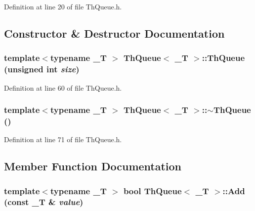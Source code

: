 Definition at line 20 of file ThQueue.h.

\subsection{Constructor \& Destructor Documentation}
\hypertarget{class_th_queue_6110171ecc9891a3d485b993ec4c14d2}{
\subsubsection[{ThQueue}]{\setlength{\rightskip}{0pt plus 5cm}template$<$typename \_\-T $>$ {\bf ThQueue}$<$ \_\-T $>$::{\bf ThQueue} (unsigned int {\em size})}}
\label{class_th_queue_6110171ecc9891a3d485b993ec4c14d2}




Definition at line 60 of file ThQueue.h.\hypertarget{class_th_queue_b32a990df6751f082db18f3c2cbcb8b8}{
\subsubsection[{$\sim$ThQueue}]{\setlength{\rightskip}{0pt plus 5cm}template$<$typename \_\-T $>$ {\bf ThQueue}$<$ \_\-T $>$::$\sim${\bf ThQueue} ()}}
\label{class_th_queue_b32a990df6751f082db18f3c2cbcb8b8}




Definition at line 71 of file ThQueue.h.

\subsection{Member Function Documentation}
\hypertarget{class_th_queue_fd43d1b440516fbf12ebc68e6163180d}{
\subsubsection[{Add}]{\setlength{\rightskip}{0pt plus 5cm}template$<$typename \_\-T $>$ bool {\bf ThQueue}$<$ \_\-T $>$::Add (const \_\-T \& {\em value})}}
\label{class_th_queue_fd43d1b440516fbf12ebc68e6163180d}




